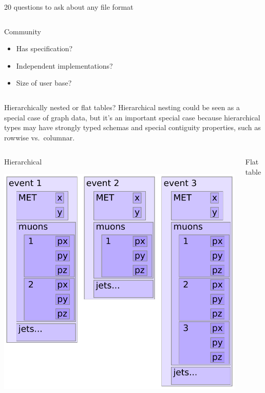 \documentclass[aspectratio=169]{beamer}
\begin{document}
\begin{frame}{20 questions to ask about any file format}
\begin{columns}
\vspace{-0.2 cm}

\begin{block}{Community}
\vspace{-0.2 cm}
\begin{itemize}\setlength{\itemsep}{-0.05 cm}
\item Has specification?
\item Independent implementations?
\item Size of user base?
\end{itemize}
\end{block}

\end{columns}
\end{frame}

\begin{frame}{Hierarchically nested or flat tables?}
\vspace{0.5 cm}
Hierarchical nesting could be seen as a special case of graph data, but it's an important special case because hierarchical types may have strongly typed schemas and special contiguity properties, such as rowwise vs.\ columnar.

\vspace{-0.5 cm}

\begin{columns}[t]
\begin{center}
Hierarchical

\vspace{0.2 cm}
\includegraphics[width=0.7\linewidth]{event-structure.pdf}
\end{center}
\begin{center}
Flat table


\end{center}
\end{columns}
\end{frame}
\end{document}
